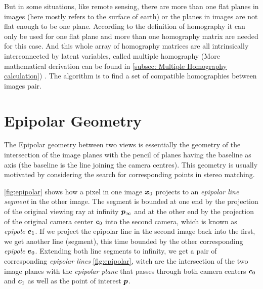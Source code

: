 But in some situations, like remote sensing,  there are more than one flat planes in images (here mostly refers to the surface of earth) or the planes in images are not flat enough to be one plane. According to the definition of homography it can only be used for one flat plane and more than one homography matrix are needed for this case.  And this whole array of homography matrices are all intrinsically interconnected by latent variables, called multiple homography (More mathematical derivation can be found in \cref{subsec: Multiple Homography calculation}) . The algorithm is to find a set of compatible homographies between images pair.

\section{Epipolar Geometry}\label{sec:Epipolar Geometry}
The Epipolar geometry between two views is essentially the geometry of the intersection of the image planes with the pencil of planes having the baseline as axis (the baseline is the line joining the camera centres). This geometry is usually motivated by considering the search for corresponding points in stereo matching.

\cref{fig:epipolar} shows how a pixel in one image $ \boldsymbol{x}_{0}$ projects to an \textit{epipolar line segment} in the other image. The segment is bounded at one end by the projection of the original viewing ray at infinity $ \boldsymbol{p}_{\infty}$ and at the other end by the projection of the original camera center $ \boldsymbol{c}_{0}$ into the second camera, which is known as \textit{epipole} $\boldsymbol{e}_{1}$. If we project the epipolar line in the second image back into the first, we get another line (segment), this time bounded by the other corresponding \textit{epipole} $\boldsymbol{e}_{0}$. Extending both line segments to infinity, we get a pair of corresponding \textit{epipolar lines} \cref{fig:epipolar}, witch are the intersection of the two image planes with the \textit{epipolar plane} that passes through both camera centers $ \boldsymbol{c}_{0}$ and $ \boldsymbol{c}_{1}$ as well as the point of interest $ \boldsymbol{p}$.

